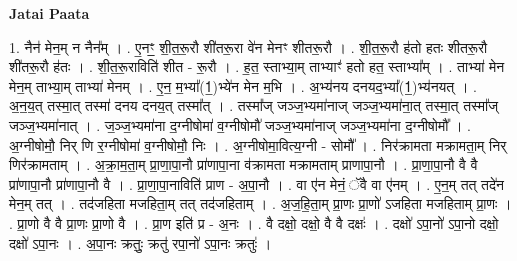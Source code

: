 \documentclass[17pt]{extarticle}
\begin{document}
\textbf{Jatai Paata} \newline

1. नैन॑ मेन॒म् न नैन᳚म् । . ए॒नꣳ॒॒ शी॒त॒रू॒रौ शी॑तरू॒रा वे॑न मेनꣳ शीतरू॒रौ । . शी॒त॒रू॒रौ ह॑तो हतः शीतरू॒रौ शी॑तरू॒रौ ह॑तः । . शी॒त॒रू॒राविति॑ शीत - रू॒रौ । . ह॒त॒ स्ताभ्या॒म् ताभ्याꣳ॑ हतो हत॒ स्ताभ्या᳚म् । . ताभ्या॑ मेन मेन॒म् ताभ्या॒म् ताभ्या॑ मेनम् । . ए॒न॒ म॒भ्या᳚(1॒)भ्ये॑न मेन म॒भि । . अ॒भ्य॑नय दनयद॒भ्या᳚(1॒)भ्य॑नयत् । . अ॒न॒य॒त् तस्मा॒त् तस्मा॑ दनय दनय॒त् तस्मा᳚त् । . तस्मा᳚ज् जञ्ज॒भ्यमा॑नाज् जञ्ज॒भ्यमा॑ना॒त् तस्मा॒त् तस्मा᳚ज् जञ्ज॒भ्यमा॑नात् । . ज॒ञ्ज॒भ्यमा॑ना द॒ग्नीषोमा॑ व॒ग्नीषोमौ॑ जञ्ज॒भ्यमा॑नाज् जञ्ज॒भ्यमा॑ना द॒ग्नीषोमौ᳚ । . अ॒ग्नीषोमौ॒ निर् णि र॒ग्नीषोमा॑ व॒ग्नीषोमौ॒ निः । . अ॒ग्नीषोमा॒वित्य॒ग्नी - सोमौ᳚ । . निर॑क्रामता मक्रामता॒म् निर् णिर॑क्रामताम् । . अ॒क्रा॒म॒ता॒म् प्रा॒णा॒पा॒नौ प्रा॑णापा॒ना व॑क्रामता मक्रामताम् प्राणापा॒नौ । . प्रा॒णा॒पा॒नौ वै वै प्रा॑णापा॒नौ प्रा॑णापा॒नौ वै । . प्रा॒णा॒पा॒नाविति॑ प्राण - अ॒पा॒नौ । . वा ए॑न मेनं॒ ॅवै वा ए॑नम् । . ए॒न॒म् तत् तदे॑न मेन॒म् तत् । . तद॑जहिता मजहिता॒म् तत् तद॑जहिताम् । . अ॒ज॒हि॒ता॒म् प्रा॒णः प्रा॒णो॑ ऽजहिता मजहिताम् प्रा॒णः । . प्रा॒णो वै वै प्रा॒णः प्रा॒णो वै । . प्रा॒ण इति॑ प्र - अ॒नः । . वै दक्षो॒ दक्षो॒ वै वै दक्षः॑ । . दक्षो॑ ऽपा॒नो॑ ऽपा॒नो दक्षो॒ दक्षो॑ ऽपा॒नः । . अ॒पा॒नः क्रतुः॒ क्रतु॑ रपा॒नो॑ ऽपा॒नः क्रतुः॑ । \newline
\end{document}
